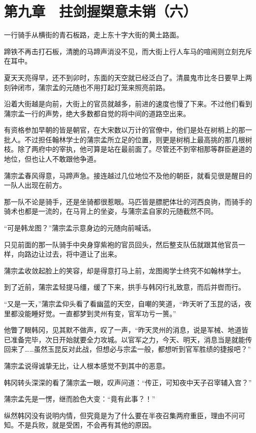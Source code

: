 \section{第九章　拄剑握槊意未销（六）}

一行骑手从横街的青石板路，走上东十字大街的黄土路面。

蹄铁不再击打石板，清脆的马蹄声消没不见，而大街上行人车马的喧闹则立刻充斥在耳中。

夏天天亮得早，还不到卯时，东面的天空就已经泛白了。清晨鬼市比冬日要早上两刻钟闭市，蒲宗孟的元随也不用打起灯笼来照亮前路。

沿着大街越是向前，大街上的官员就越多，前进的速度也慢了下来。不过他们看到蒲宗孟一行的声势，绝大多数都自觉的将中间的道路空出来。

有资格参加早朝的皆是朝官，在大宋数以万计的官僚中，他们是处在树梢上的那一批人。不过担任翰林学士的蒲宗孟所立足的位置，则更是树梢上最高挑的那几根树枝。除了两府中的宰执，他可算是站在最前面了。尽管还不到宰相那等群臣避道的地位，但也让人不敢跟他争道。

蒲宗孟春风得意，马蹄声急。接连越过几位地位不及他的朝臣，就看见很是醒目的一队人出现在前方。

那一队不论是骑手，还是坐骑都很惹眼。马匹皆是膘肥体壮的河西良驹，而骑手的骑术也都是一流的，在马背上的坐姿，与蒲宗孟自家的元随截然不同。

“可是韩龙图？”蒲宗孟示意身边的元随向前喊话。

只见前面的那一队骑手中央身穿紫袍的官员回头，然后整支队伍就跟其他官员一样，向路边让过去，将中道让了出来。

蒲宗孟收敛起脸上的笑容，却是得意打马上前，龙图阁学士终究不如翰林学士。

到了近前，蒲宗孟轻提马缰，缓了下来，拱手与韩冈行礼致意，而后并辔而行。

“又是一天，”蒲宗孟仰头看了看幽蓝的天空，自嘲的笑道，“昨天听了玉昆的话，夜里都没能睡好觉。一直都梦到灵州有变，官军功亏一篑。”

他瞥了眼韩冈，见其默不做声，叹了一声，“昨天灵州的消息，说是军械、地道皆已准备完毕，次日开始就要全力攻城。以官军之力，今天、明天，消息当是就能传回来了……虽然玉昆反对此战，但想必与宗孟一般，都想听到官军胜绩的捷报吧？”

蒲宗孟说得诚挚无比，让人根本感觉不到其中的恶意。

韩冈转头深深的看了蒲宗孟一眼，叹声问道：“传正，可知夜中天子召宰辅入宫？”

蒲宗孟先是一愣，继而脸色大变：“竟有此事？！”

纵然韩冈没有说明内情，但究竟是为了什么要在半夜召集两府重臣，理由不问可知。不是兵败，就是受困，不会再有其他的原因。


